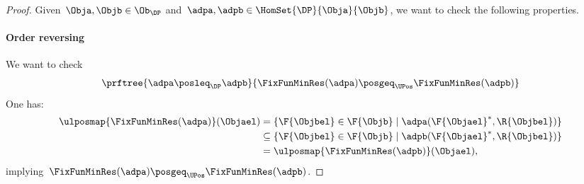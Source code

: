 \begin{proof}
Given~$\Obja,\Objb \in \Ob_\DP$ and~$\adpa,\adpb \in \HomSet{\DP}{\Obja}{\Objb}$, we want to check the following properties.
\paragraph*{Order reversing}
We want to check
\begin{equation*}
\prftree{\adpa \posleq_\DP \adpb}{\FixFunMinRes(\adpa) \posgeq_\UPos \FixFunMinRes(\adpb)}
\end{equation*}
One has:
\begin{equation*}
\begin{aligned}
\ulposmap{\FixFunMinRes(\adpa)}(\Objael)&=\{\F{\Objbel} \in \F{\Objb} \mid \adpa(\F{\Objael}^*, \R{\Objbel})\}\\
&\subseteq \{\F{\Objbel} \in \F{\Objb} \mid \adpb(\F{\Objael}^*, \R{\Objbel})\}\\
&= \ulposmap{\FixFunMinRes(\adpb)}(\Objael),
\end{aligned}
\end{equation*}
implying~$\FixFunMinRes(\adpa) \posgeq_\UPos \FixFunMinRes(\adpb)$.

\end{proof}
